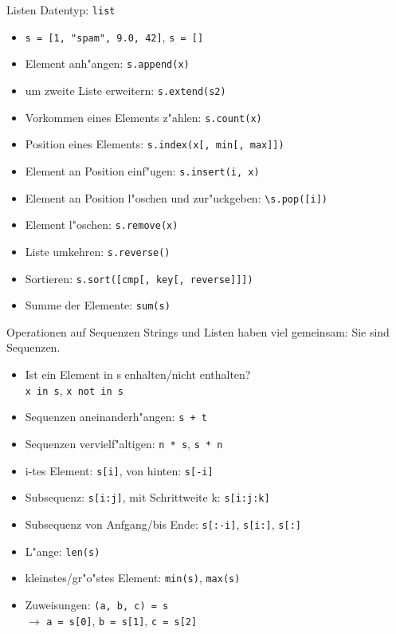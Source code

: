 \begin{frame}{Listen}
Datentyp: \alert{\lstinline{list}}
\begin{itemize}
\item \lstinline{s = [1, "spam", 9.0, 42]}, \;\lstinline{s = []}
\item \alert{Element anh"angen}: \lstinline{s.append(x)}
\item um zweite Liste erweitern: \lstinline{s.extend(s2)}
\item Vorkommen eines Elements z"ahlen: \lstinline{s.count(x)}
\item Position eines Elements: \lstinline{s.index(x[, min[, max]])}
\item Element an Position einf"ugen: \lstinline{s.insert(i, x)}
\item Element an Position l"oschen und zur"uckgeben: \lstinline{\s.pop([i])}
\item \alert{Element l"oschen}: \lstinline{s.remove(x)}
\item Liste umkehren: \lstinline{s.reverse()}
\item \alert{Sortieren}: \lstinline{s.sort([cmp[, key[, reverse]]])}
\item Summe der Elemente: \lstinline{sum(s)}
\end{itemize}
\end{frame}

\begin{frame}{Operationen auf Sequenzen}
Strings und Listen haben viel gemeinsam: Sie sind \alert{Sequenzen}.
\begin{itemize}
\item Ist ein Element in s enhalten/nicht enthalten?\\
 \lstinline{x in s}, \lstinline{x not in s}
\item Sequenzen aneinanderh"angen: \lstinline{s + t}
\item Sequenzen vervielf"altigen: \lstinline{n * s}, \lstinline{s * n}
\item \alert{i-tes Element}: \lstinline{s[i]}, von hinten: \lstinline{s[-i]}
\item Subsequenz: \lstinline{s[i:j]}, mit Schrittweite k: \lstinline{s[i:j:k]}
\item Subsequenz von Anfgang/bis Ende: \lstinline{s[:-i]}, \lstinline{s[i:]}, \lstinline{s[:]}
\item \alert{L"ange}: \lstinline{len(s)}
\item kleinstes/gr"o"stes Element: \lstinline{min(s)}, \lstinline{max(s)}
\item Zuweisungen: \lstinline{(a, b, c) = s} \\
$\rightarrow$ \lstinline{a = s[0]}, \lstinline{b = s[1]}, \lstinline{c = s[2]}
\end{itemize}
\end{frame}

